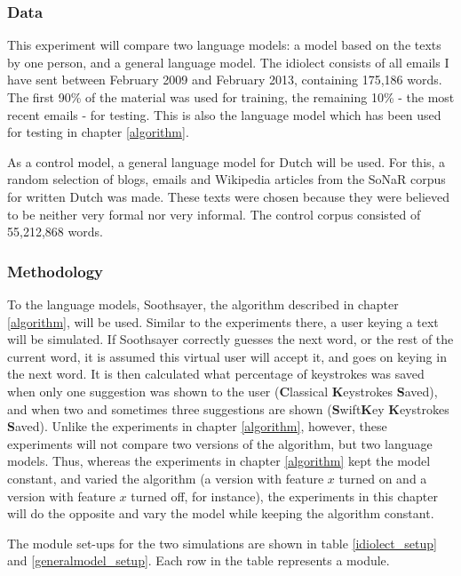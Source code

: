 \documentclass[12pt]{article}
\begin{document}
\subsubsection{Data} \label{data_simple}
This experiment will compare two language models: a model based on the texts by one person, and a general language model. The idiolect consists of all emails I have sent between February 2009 and February 2013, containing 175,186 words. The first 90\% of the material was used for training, the remaining 10\% - the most recent emails - for testing. This is also the language model which has been used for testing in chapter \ref{algorithm}. 

As a control model, a general language model for Dutch will be used. For this, a random selection of blogs, emails and Wikipedia articles from the SoNaR corpus for written Dutch  was made. These texts were chosen because they were believed to be neither very formal nor very informal. The control corpus consisted of 55,212,868 words.

\subsubsection{Methodology}
To the language models, Soothsayer, the algorithm described in chapter \ref{algorithm}, will be used. Similar to the experiments there, a user keying a text will be simulated. If Soothsayer correctly guesses the next word, or the rest of the current word, it is assumed this virtual user will accept it, and goes on keying in the next word. It is then calculated what percentage of keystrokes was saved when only one suggestion was shown to the user (\textbf{C}lassical \textbf{K}eystrokes \textbf{S}aved), and when two and sometimes three suggestions are shown (\textbf{S}wift\textbf{K}ey \textbf{K}eystrokes \textbf{S}aved). Unlike the experiments in chapter \ref{algorithm}, however, these experiments will not compare two versions of the algorithm, but two language models. Thus, whereas the experiments in chapter \ref{algorithm} kept the model constant, and varied the algorithm (a version with feature $x$ turned on and a version with feature $x$ turned off, for instance), the experiments in this chapter will do the opposite and vary the model while keeping the algorithm constant. 

The module set-ups for the two simulations are shown in table \ref{idiolect_setup} and \ref{generalmodel_setup}. Each row in the table represents a module.
\end{document}
